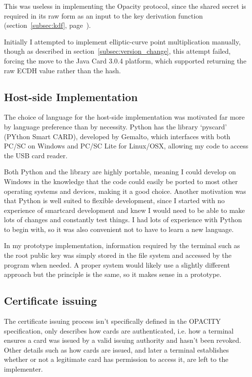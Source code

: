 \documentclass[12pt,a4paper]{article}
\begin{document}
This was useless in implementing the Opacity protocol, since the shared secret is required in its raw form as an input to the key derivation function (section~\ref{subsec:kdf}, page~\pageref{subsec:kdf}).

Initially I attempted to implement elliptic-curve point multiplication manually, though as described in section~\ref{subsec:version_change}, this attempt failed, forcing the move to the Java Card 3.0.4 platform, which supported returning the raw ECDH value rather than the hash.

\subsection{Host-side Implementation}

The choice of language for the host-side implementation was motivated far more by language preference than by necessity. Python has the library `pyscard' (PYthon Smart CARD), developed by Gemalto, which interfaces with both PC/SC on Windows and PC/SC Lite for Linux/OSX, allowing my code to access the USB card reader.

Both Python and the library are highly portable, meaning I could develop on Windows in the knowledge that the code could easily be ported to most other operating systems and devices, making it a good choice. Another motivation was that Python is well suited to flexible development, since I started with no experience of smartcard development and knew I would need to be able to make lots of changes and constantly test things. I had lots of experience with Python to begin with, so it was also convenient not to have to learn a new language.

In my prototype implementation, information required by the terminal such as the root public key was simply stored in the file system and accessed by the program when needed. A proper system would likely use a slightly different approach but the principle is the same, so it makes sense in a prototype.






\subsection{Certificate issuing}
The certificate issuing process isn't specifically defined in the OPACITY specification, only describes how cards are authenticated, i.e. how a terminal ensures a card was issued by a valid issuing authority and hasn't been revoked. Other details such as how cards are issued, and later a terminal establishes whether or not a legitimate card has permission to access it, are left to the implementer.
\end{document}
